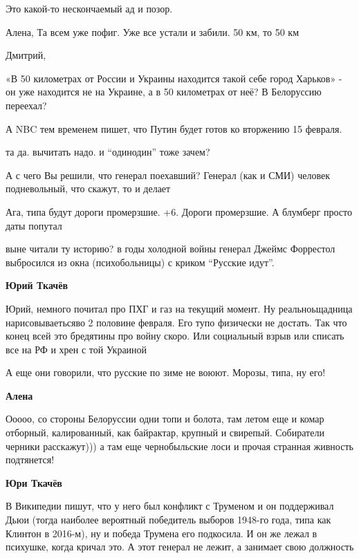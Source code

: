 \begin{itemize} %
Это какой-то нескончаемый ад и позор.

Алена, 
Та всем уже пофиг. Уже все устали и забили. 50 км, то 50 км

Дмитрий, 

«В 50 километрах от России и Украины находится такой себе город Харьков» - он
уже находится не на Украине, а в 50 километрах от неё? В Белоруссию переехал?

А NBC тем временем пишет, что Путин будет готов ко вторжению 15 февраля.


та да. вычитать надо. и \enquote{одинодин} тоже зачем?


А с чего Вы решили, что генерал поехавший? Генерал (как и СМИ) человек
подневольный, что скажут, то и делает


Ага, типа будут дороги промерзшие. +6. Дороги промерзшие. А блумберг просто даты попутал


выне читали ту историю? в годы холодной войны генерал Джеймс Форрестол
выбросился из окна (психобольницы) с криком \enquote{Русские идут}.

\textbf{Юрий Ткачёв}

Юрий, немного почитал про ПХГ и газ на текущий момент. Ну реальноьщадница
нарисовываетьсяво 2 половине февраля. Его тупо физически не достать. Так что
конец всей это бредятины про войну скоро. Или социальный взрыв или списать все
на РФ и хрен с той Украиной


А еще они говорили, что русские по зиме не воюют. Морозы, типа, ну его!

\textbf{Алена}

Ооооо, со стороны Белоруссии  одни топи и болота, там летом еще и комар
отборный, калированный, как байрактар, крупный и свирепый. Собиратели черники
расскажут))) а там еще чернобыльские лоси и прочая странная живность
подтянется!

\textbf{Юри Ткачёв}

В Википедии пишут, что у него был конфликт с Труменом и он поддерживал Дьюи
(тогда наиболее вероятный победитель выборов 1948-го года, типа как Клинтон в
2016-м), ну и победа Трумена его подкосила. И он же лежал в психушке, когда
кричал это. А этот генерал не лежит, а занимает свою должность


\end{itemize}

